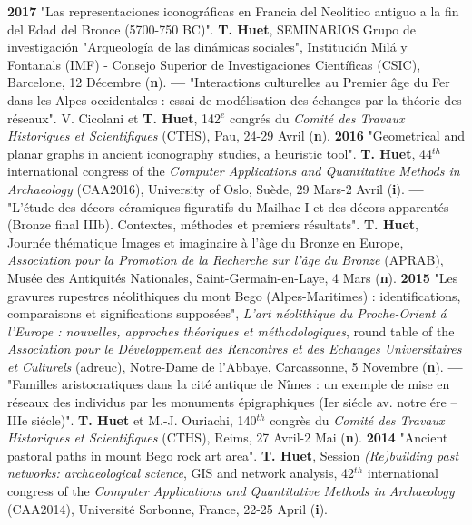 \documentclass{article}
\begin{document}
\smallbreak
\textbf{2017 }"Las representaciones iconogr\'{a}ficas en Francia del Neol\'{i}tico antiguo a la fin del Edad del Bronce (5700-750 BC)". \textbf{T. Huet}, SEMINARIOS Grupo de investigaci\'{o}n "Arqueolog\'{i}a de las din\'{a}micas sociales", Instituci\'{o}n Mil\'{a} y Fontanals (IMF) - Consejo Superior de Investigaciones Cient\'{i}ficas (CSIC), Barcelone, 12 D\'{e}cembre (\textbf{n}).
\smallbreak
\textbf{--- } "Interactions culturelles au Premier \^{a}ge du Fer dans les Alpes occidentales : essai de mod\'{e}lisation des \'{e}changes par la th\'{e}orie des r\'{e}seaux". V. Cicolani et \textbf{T. Huet}, 142${}^{e}$ congr\'{e}s du \textit{Comit\'{e} des Travaux Historiques et Scientifiques} (CTHS), Pau, 24-29 Avril (\textbf{n}).
\smallbreak
\textbf{2016 }"Geometrical and planar graphs in ancient iconography studies, a heuristic tool". \textbf{T. Huet}, 44${}^{th}$ international congress of the \textit{Computer Applications and Quantitative Methods in Archaeology} (CAA2016), University of Oslo, Suède, 29 Mars-2 Avril (\textbf{i}).
\smallbreak
\textbf{--- }"L'\'{e}tude des d\'{e}cors c\'{e}ramiques figuratifs du Mailhac I et des d\'{e}cors apparent\'{e}s (Bronze final IIIb). Contextes, m\'{e}thodes et premiers r\'{e}sultats". \textbf{T. Huet}, Journ\'{e}e th\'{e}matique Images et imaginaire \`{a} l'\^{a}ge du Bronze en Europe, \textit{Association pour la Promotion de la Recherche sur l'\^{a}ge du Bronze} (APRAB), Mus\'{e}e des Antiquit\'{e}s Nationales, Saint-Germain-en-Laye, 4 Mars (\textbf{n}).
\smallbreak
\textbf{2015 }"Les gravures rupestres n\'{e}olithiques du mont Bego (Alpes-Maritimes) : identifications, comparaisons et significations suppos\'{e}es", \textit{L'art n\'{e}olithique du Proche-Orient \'{a} l'Europe : nouvelles, approches th\'{e}oriques et m\'{e}thodologiques}, round table of the \textit{Association pour le D\'{e}veloppement des Rencontres et des Echanges Universitaires et Culturels} (adreuc), Notre-Dame de l'Abbaye, Carcassonne, 5 Novembre (\textbf{n}).
\smallbreak
\textbf{--- }"Familles aristocratiques dans la cit\'{e} antique de N\^{i}mes : un exemple de mise en r\'{e}seaux des individus par les monuments \'{e}pigraphiques (Ier si\'{e}cle av. notre \'{e}re -- IIIe si\'{e}cle)". \textbf{T. Huet} et M.-J. Ouriachi, 140${}^{th}$ congrès du \textit{Comit\'{e} des Travaux Historiques et Scientifiques} (CTHS), Reims, 27 Avril-2 Mai (\textbf{n}).
\smallbreak
\textbf{2014 }"Ancient pastoral paths in mount Bego rock art area". \textbf{T. Huet}, Session \textit{(Re)building past networks: archaeological science}, GIS and network analysis, 42${}^{th}$ international congress of the \textit{Computer Applications and Quantitative Methods in Archaeology} (CAA2014), Universit\'{e} Sorbonne, France, 22-25 April (\textbf{i}).
\end{document}

